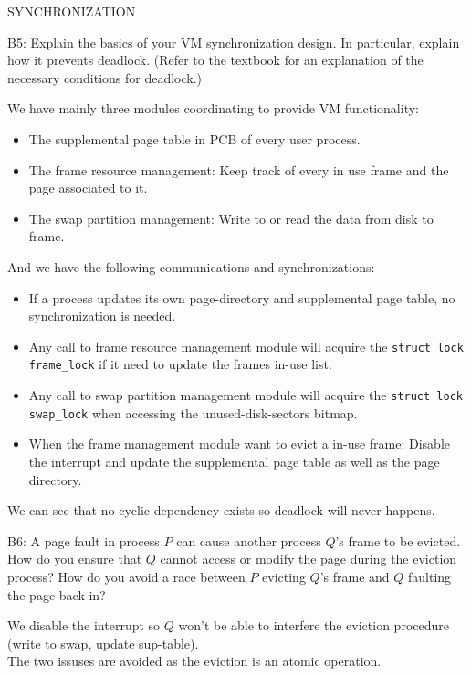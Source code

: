 \begin{aspect}{SYNCHRONIZATION}
	\begin{qc}
		B5: Explain the basics of your VM synchronization design.
		In particular, explain how it prevents deadlock.
		(Refer to the textbook for an explanation of the necessary conditions for deadlock.)
	\end{qc}
	We have mainly three modules coordinating to provide VM functionality:
	\begin{itemize}
		\item The supplemental page table in PCB of every user process.
		\item The frame resource management: Keep track of every in use frame and the page associated to it.
		\item The swap partition management: Write to or read the data from disk to frame.
	\end{itemize}
	And we have the following communications and synchronizations:
	\begin{itemize}
		\item If a process updates its own page-directory and supplemental page table, no synchronization is needed.
		\item Any call to frame resource management module will acquire the \lstinline{struct lock frame_lock} if it need to update the frames in-use list.
		\item Any call to swap partition management module will acquire the \lstinline{struct lock swap_lock} when accessing the unused-disk-sectors bitmap.
		\item When the frame management module want to evict a in-use frame:
		      Disable the interrupt and update the supplemental page table as well as the page directory.
	\end{itemize}
	We can see that no cyclic dependency exists so deadlock will never happens.

	\begin{qc}
		B6: A page fault in process $P$ can cause another process $Q$'s frame to be evicted.
		How do you ensure that $Q$ cannot access or modify the page during the eviction process?
		How do you avoid a race between $P$ evicting $Q$'s frame and $Q$ faulting the page back in?
	\end{qc}
	We disable the interrupt so $Q$ won't be able to interfere the eviction procedure (write to swap, update sup-table).\\
	The two issuses are avoided as the eviction is an atomic operation.


\end{aspect}
